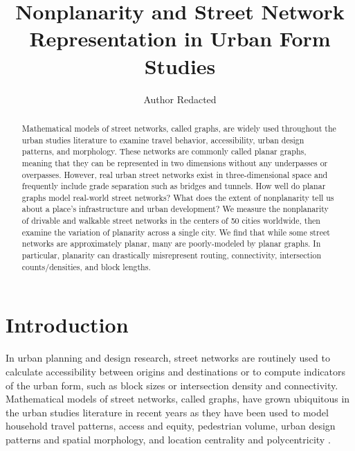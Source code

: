 \documentclass[Afour,sageh,times]{sagej}
\begin{document}
\title{Nonplanarity and Street Network Representation in Urban Form Studies}
\author{Author Redacted }


\begin{abstract}

Mathematical models of street networks, called graphs, are widely used throughout the urban studies literature to examine travel behavior, accessibility, urban design patterns, and morphology. These networks are commonly called planar graphs, meaning that they can be represented in two dimensions without any underpasses or overpasses. However, real urban street networks exist in three-dimensional space and frequently include grade separation such as bridges and tunnels. How well do planar graphs model real-world street networks? What does the extent of nonplanarity tell us about a place's infrastructure and urban development? We measure the nonplanarity of drivable and walkable street networks in the centers of 50 cities worldwide, then examine the variation of planarity across a single city. We find that while some street networks are approximately planar, many are poorly-modeled by planar graphs. In particular, planarity can drastically misrepresent routing, connectivity, intersection counts/densities, and block lengths.

\end{abstract}


\maketitle

\section{Introduction}

In urban planning and design research, street networks are routinely used to calculate accessibility between origins and destinations or to compute indicators of the urban form, such as block sizes or intersection density and connectivity. Mathematical models of street networks, called graphs, have grown ubiquitous in the urban studies literature in recent years as they have been used to model household travel patterns, access and equity, pedestrian volume, urban design patterns and spatial morphology, and location centrality and polycentricity \citep{southworth_street_1995,marshall_street_2010,porta_alterations_2014,marshall_community_2014,hajrasouliha_impact_2015,parthasarathi_street_2015,knight_metrics_2015,gil_street_2016,zhong_revealing_2017}.
\end{document}
